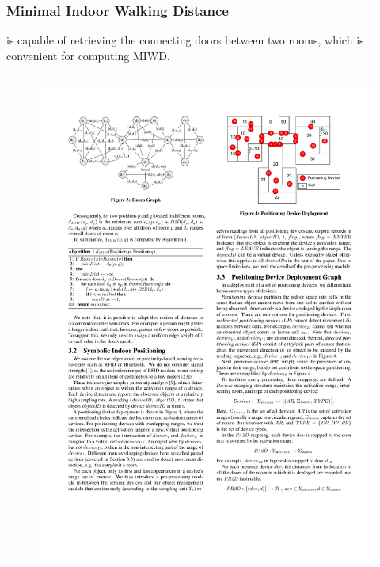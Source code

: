 
\begin{frame}
\frametitle{Minimal Indoor Walking Distance}

 is capable of retrieving the connecting doors between two rooms, which is convenient for computing MIWD.

\begin{columns}[c]

    \begin{figure}[tb]
      \includegraphics[width=\columnwidth]{figures/2-3/2-3-2.pdf}
    \end{figure}


\end{columns}
\end{frame}
